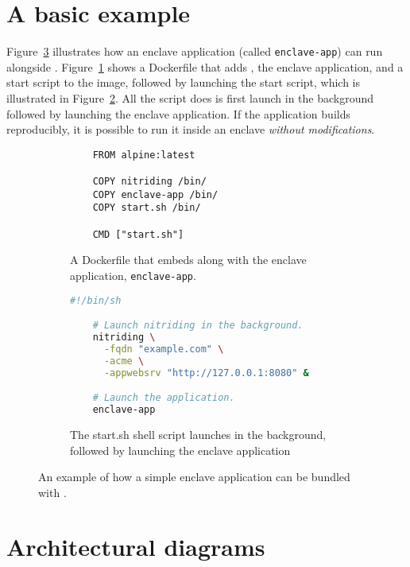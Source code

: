 \section{A basic example}%
\label{sec:example}

Figure~\ref{fig:example} illustrates how an enclave application (called
\texttt{enclave-app}) can run alongside \tool{}.  Figure~\ref{fig:dockerfile}
shows a Dockerfile that adds \tool{}, the enclave application, and a start
script to the image, followed by launching the start script, which is
illustrated in Figure~\ref{fig:start}.  All the script does is first launch
\tool{} in the background followed by launching the enclave application.  If
the application builds reproducibly, it is possible to run it inside an enclave
\emph{without modifications}.

\begin{figure}[t]
  \begin{subfigure}[b]{\linewidth}
    \centering
    \begin{lstlisting}
    FROM alpine:latest

    COPY nitriding /bin/
    COPY enclave-app /bin/
    COPY start.sh /bin/

    CMD ["start.sh"]\end{lstlisting}
    \caption{A Dockerfile that embeds \tool{} along with the enclave
      application, \texttt{enclave-app}.}
    \label{fig:dockerfile}
  \end{subfigure}

  \begin{subfigure}[b]{\linewidth}
    \centering
    \begin{lstlisting}[language=bash]
    #!/bin/sh

    # Launch nitriding in the background.
    nitriding \
      -fqdn "example.com" \
      -acme \
      -appwebsrv "http://127.0.0.1:8080" &

    # Launch the application.
    enclave-app\end{lstlisting}
    \caption{The start.sh shell script launches \tool{} in the background,
    followed by launching the enclave application}
    \label{fig:start}
  \end{subfigure}

  \caption{An example of how a simple enclave application can be bundled with
  \tool.}
  \label{fig:example}
\end{figure}

\section{Architectural diagrams}%
\label{sec:more-diagrams}

